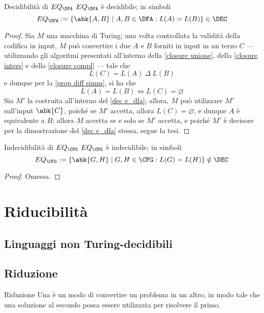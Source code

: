 \documentclass[a4paper, 12pt]{report}
\begin{document}
    \begin{framedthm}{Decidibilità di $EQ_\DFA$}
        $EQ_\DFA$ è decidibile; in simboli $$EQ_\DFA := \{\abk{A, B} \mid A, B \in \DFA : L(A) = L(B) \} \in \DEC$$
    \end{framedthm}

    \begin{proof}
        Sia $M$ una macchina di Turing; una volta controllata la validità della codifica in input, $M$ può convertire i due \DFA $A$ e $B$ forniti in input in un terzo \DFA $C$ --- utilizzando gli algoritmi presentati all'interno della \cref{closure unione}, della \cref{closure inters} e della \cref{closure compl} --- tale che $$L(C) = L(A) \ \Delta \ L(B)$$ e dunque per la \cref{prop diff simm}, si ha che $$L(A) = L(B) \iff L(C) = \varnothing$$ Sia $M'$ la \TM costruita all'interno del \cref{dec e_dfa}; allora, $M$ può utilizzare $M'$ sull'input $\abk{C}$, poiché se $M'$ accetta, allora $L(C) = \varnothing$, e dunque $A$ è equivalente a $B$; allora $M$ accetta se e solo se $M'$ accetta, e poiché $M'$ è decisore per la dimostrazione del \cref{dec e_dfa} stessa, segue la tesi.
    \end{proof}

    \begin{framedthm}{Indecidibilità di $EQ_\CFG$}
        $EQ_\CFG$ è indecidibile; in simboli $$EQ_\CFG := \{\abk{G,H} \mid G,H \in \CFG : L(G) = L(H)\} \notin \DEC$$
    \end{framedthm}

    \begin{proof}
        Omessa.
    \end{proof}

    \chapter{Riducibilità}

    \section{Linguaggi non Turing-decidibili}

    \section{Riduzione}

    \begin{frameddefn}{Riduzione}
        Una  è un modo di convertire un problema in un altro, in modo tale che una soluzione al secondo possa essere utilizzata per risolvere il primo.
    \end{frameddefn}
\end{document}
